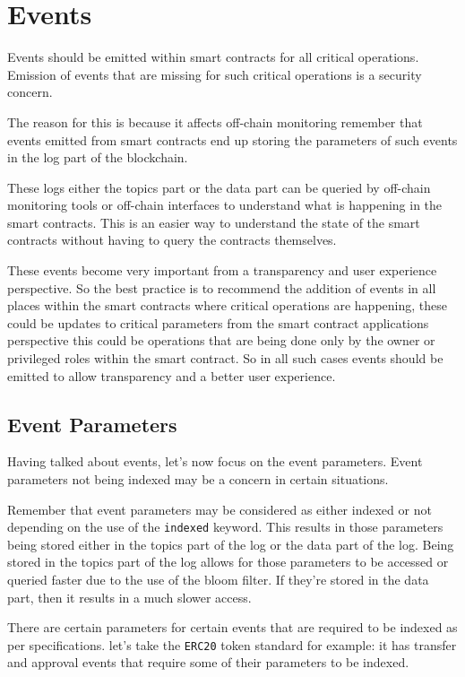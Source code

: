 \section{Events}\label{events}

Events should be emitted within smart contracts for all critical
operations. Emission of events that are missing for such critical
operations is a security concern.

The reason for this is because it affects off-chain monitoring remember
that events emitted from smart contracts end up storing the parameters
of such events in the log part of the blockchain.

These logs either the topics part or the data part can be queried by
off-chain monitoring tools or off-chain interfaces to understand what is
happening in the smart contracts. This is an easier way to understand
the state of the smart contracts without having to query the contracts
themselves.

These events become very important from a transparency and user
experience perspective. So the best practice is to recommend the
addition of events in all places within the smart contracts where
critical operations are happening, these could be updates to critical
parameters from the smart contract applications perspective this could
be operations that are being done only by the owner or privileged roles
within the smart contract. So in all such cases events should be emitted
to allow transparency and a better user experience.

\subsection{Event Parameters}\label{event-parameters}

Having talked about events, let's now focus on the event parameters.
Event parameters not being indexed may be a concern in certain
situations.

Remember that event parameters may be considered as either indexed or
not depending on the use of the \texttt{indexed} keyword. This results
in those parameters being stored either in the topics part of the log or
the data part of the log. Being stored in the topics part of the log
allows for those parameters to be accessed or queried faster due to the
use of the bloom filter. If they're stored in the data part, then it
results in a much slower access.

There are certain parameters for certain events that are required to be
indexed as per specifications. let's take the \texttt{ERC20} token
standard for example: it has transfer and approval events that require
some of their parameters to be indexed.

